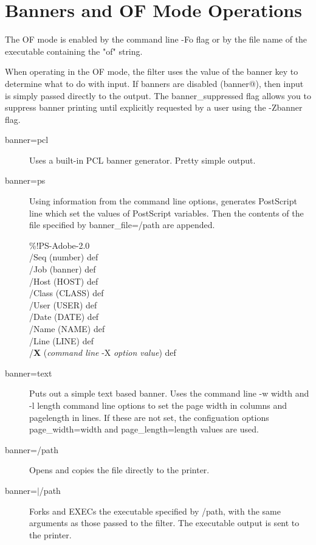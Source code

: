 \documentclass[a4paper]{article}
\begin{document}
\section{Banners and OF Mode Operations
\label{banner}
\label{banner_file}
\label{page_width}
\label{page_length}}

The OF mode is enabled by the command line -Fo flag or by
the file name of the executable containing the "of" string.

When operating in the OF mode,  the filter uses the value of the
banner key to determine what to do with input.  If banners are
disabled
({\ttfamily banner@}),
then input is simply passed directly to the
output.
The banner\_suppressed flag allows you to suppress banner printing
until explicitly requested by a user using the -Zbanner flag.
\begin{description}
\item[{\ttfamily banner=pcl}] \mbox{}

Uses a built-in PCL banner generator.  Pretty simple output.

\item[{\ttfamily  banner=ps }] \mbox{}

Using information from the command line options,  generates
PostScript line which set the values of PostScript variables.
Then the contents of the file specified by
{\ttfamily banner\_file=/path}
are appended.
\begin{tscreen}
\%!PS-Adobe-2.0 \\ 
/Seq (number) def \\ 
/Job (banner) def \\ 
/Host (HOST) def \\ 
/Class (CLASS) def \\ 
/User (USER) def \\ 
/Date (DATE) def \\ 
/Name (NAME) def \\ 
/Line (LINE) def \\ 
/{\bfseries X} ({\itshape command line\/} {\ttfamily -X} {\itshape option value\/}) def 
\end{tscreen}


\item[{\ttfamily banner=text}] \mbox{}

Puts out a simple text based banner.
Uses the command line
{\ttfamily -w width} and {\ttfamily -l length}
command line options to set the page width in columns
and pagelength in lines.
If these are not set,
the configuation options
{\ttfamily page\_width=width}
and
{\ttfamily page\_length=length}
values are used.

\item[{\ttfamily banner=/path}] \mbox{}

Opens and copies the file directly to the printer.

\item[{\ttfamily  banner=$|$/path }] \mbox{}

Forks and EXECs the executable specified by
{\ttfamily /path},
with the same arguments as those passed to the filter.
The executable output is sent to the printer.

\end{description}
\end{document}
